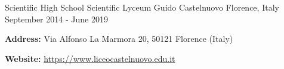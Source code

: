 \begin{cventries}
  \cventry
    {Scientific High School} %
    {Scientific Lyceum Guido Castelnuovo} %
    {Florence, Italy} %
    {September 2014 - June 2019} %
    {
      \begin{cvitems} %
        \item {\textbf{Address:} Via Alfonso La Marmora 20, 50121 Florence (Italy)}
        \item {\textbf{Website:} \href{https://www.liceocastelnuovo.edu.it}{https://www.liceocastelnuovo.edu.it}}
      \end{cvitems}
    }

\end{cventries}
